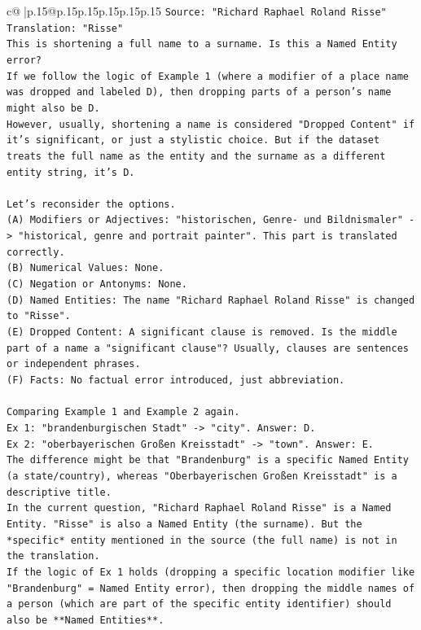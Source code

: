 \documentclass{article}
\begin{document}
{\begin{supertabular}{c@{$\;$}|p{.15\linewidth}@{}p{.15\linewidth}p{.15\linewidth}p{.15\linewidth}p{.15\linewidth}p{.15\linewidth}}
{{{\texttt{Source: "Richard Raphael Roland Risse"} \\
\texttt{Translation: "Risse"} \\
\texttt{This is shortening a full name to a surname. Is this a Named Entity error?} \\
\texttt{If we follow the logic of Example 1 (where a modifier of a place name was dropped and labeled D), then dropping parts of a person's name might also be D.} \\
\texttt{However, usually, shortening a name is considered "Dropped Content" if it's significant, or just a stylistic choice. But if the dataset treats the full name as the entity and the surname as a different entity string, it's D.} \\
\\ 
\texttt{Let's reconsider the options.} \\
\texttt{(A) Modifiers or Adjectives: "historischen, Genre{-} und Bildnismaler" {-}> "historical, genre and portrait painter". This part is translated correctly.} \\
\texttt{(B) Numerical Values: None.} \\
\texttt{(C) Negation or Antonyms: None.} \\
\texttt{(D) Named Entities: The name "Richard Raphael Roland Risse" is changed to "Risse".} \\
\texttt{(E) Dropped Content: A significant clause is removed. Is the middle part of a name a "significant clause"? Usually, clauses are sentences or independent phrases.} \\
\texttt{(F) Facts: No factual error introduced, just abbreviation.} \\
\\ 
\texttt{Comparing Example 1 and Example 2 again.} \\
\texttt{Ex 1: "brandenburgischen Stadt" {-}> "city". Answer: D.} \\
\texttt{Ex 2: "oberbayerischen Großen Kreisstadt" {-}> "town". Answer: E.} \\
\texttt{The difference might be that "Brandenburg" is a specific Named Entity (a state/country), whereas "Oberbayerischen Großen Kreisstadt" is a descriptive title.} \\
\texttt{In the current question, "Richard Raphael Roland Risse" is a Named Entity. "Risse" is also a Named Entity (the surname). But the *specific* entity mentioned in the source (the full name) is not in the translation.} \\
\texttt{If the logic of Ex 1 holds (dropping a specific location modifier like "Brandenburg" = Named Entity error), then dropping the middle names of a person (which are part of the specific entity identifier) should also be **Named Entities**.} \\
}}}
\end{supertabular}}
\end{document}
